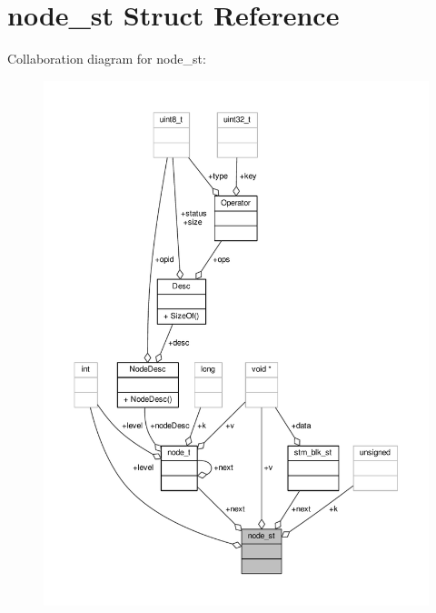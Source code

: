 \hypertarget{structnode__st}{\section{node\-\_\-st Struct Reference}
\label{structnode__st}
}


Collaboration diagram for node\-\_\-st\-:
\nopagebreak
\begin{figure}[H]
\begin{center}
\leavevmode
\includegraphics[width=350pt]{structnode__st__coll__graph}
\end{center}
\end{figure}
